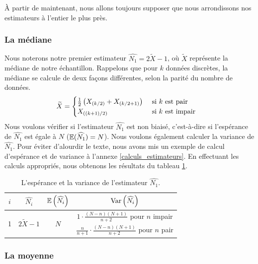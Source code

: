 \documentclass[10pt]{article}
\begin{document}
À partir de maintenant, nous allons toujours supposer que nous
arrondissons nos estimateurs à l'entier le plus près.

\hypertarget{la-mediane}{%
\subsubsection{La médiane}\label{la-mediane}}

Nous noterons notre premier estimateur
\(\widehat{N_1}=2\widetilde{X}-1\), où \(\widetilde{X}\) représente la
médiane de notre échantillon. Rappelons que pour \(k\) données
discrètes, la médiane se calcule de deux façons différentes, selon la
parité du nombre de données. \begin{align*}
\widetilde{X} &= 
\begin{cases}
\frac{1}{2}\left(X_{\left(k/2\right)}+X_{\left(k/2+1\right)}\right) & \text{ si $k$ est pair} \\
X_{\left((k+1)/2\right)} & \text{ si $k$ est impair} \\
\end{cases}
\end{align*} Nous voulons vérifier si l'estimateur \(\widehat{N_1}\) est
non biaisé, c'est-à-dire si l'espérance de \(\widehat{N_1}\) est égale à
\(N\) (\(\operatorname{\mathbb{E}} (\widehat{N_1})=N\)). Nous voulons également calculer la
variance de \(\widehat{N_1}\). Pour éviter d'alourdir le texte, nous
avons mis un exemple de calcul d'espérance et de variance à l'annexe
\ref{calculs_estimateurs}. En effectuant les calculs appropriés, nous
obtenons les résultats du tableau \ref{tab:estimateur_n1}.

\begin{table}[ht]
\begin{center}
\begin{tabular}{|c|c|c|c|}
\hline
$i$ & $\widehat{N_i}$ & $\operatorname{\mathbb{E}}\left(\widehat{N_i}\right)$ & $\operatorname{Var}\left(\widehat{N_i}\right)$ \\
\hline
\hline
\multirow{2}{*}{1}  & \multirow{2}{*}{$2\widetilde{X}-1$} & \multirow{2}{*}{$N$} & 
$1\cdot\frac{(N-n)(N+1)}{n+2}$ pour $n$ impair \\
& & & $\frac{n}{n+1}\cdot\frac{(N-n)(N+1)}{n+2}$ pour $n$ pair \\
\hline
\end{tabular}
\end{center}
\caption{\label{tab:estimateur_n1} {L'espérance et la variance de l'estimateur $\widehat{N_1}$.} }
\end{table}

\hypertarget{la-moyenne}{%
\subsubsection{La moyenne}\label{la-moyenne}}
\end{document}
